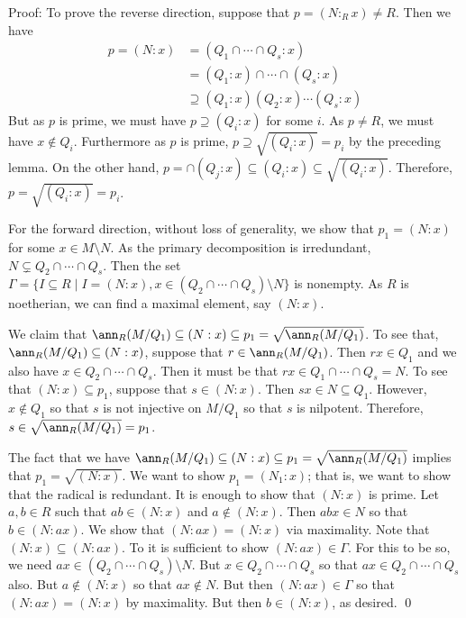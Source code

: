 \noindent Proof: To prove the reverse direction, suppose that $p=(N:_R x) \neq R$. Then we have
\[
\begin{split}
p=(N:x)&= (Q_1 \cap \cdots \cap Q_s: x) \\
&=(Q_1 :x) \cap \cdots \cap (Q_s: x) \\
&\supseteq (Q_1:x)(Q_2:x)\cdots(Q_s:x)
\end{split}
\]
But as $p$ is prime, we must have $p \supseteq (Q_i:x)$ for some $i$. As $p \neq R$, we must have $x \notin Q_i$. Furthermore as $p$ is prime, $p \supseteq \sqrt{(Q_i:x)}=p_i$ by the preceding lemma. On the other hand, $p=\cap (Q_j:x) \subseteq (Q_i:x) \subseteq \sqrt{(Q_i:x)}$. Therefore, $p=\sqrt{(Q_i:x)}=p_i$. 

For the forward direction, without loss of generality, we show that $p_1=(N:x)$ for some $x \in M \setminus N$. As the primary decomposition is irredundant, $N \subsetneq Q_2 \cap \cdots \cap Q_s$. Then the set $\Gamma=\{I \subseteq R \;|\; I=(N:x), x \in (Q_2 \cap \cdots \cap Q_s) \setminus N\}$ is nonempty. As $R$ is noetherian, we can find a maximal element, say $(N:x)$. 

We claim that $\ann_R(M/Q_1) \subseteq (N:x) \subseteq p_1=\sqrt{\ann_R(M/Q_1)}$. To see that, $\ann_R(M/Q_1) \subseteq (N:x)$, suppose that $r \in \ann_R(M/Q_1)$. Then $rx \in Q_1$ and we also have $x \in Q_2 \cap \cdots \cap Q_s$. Then it must be that $rx \in Q_1 \cap \cdots \cap Q_s=N$. To see that $(N:x) \subseteq p_1$, suppose that $s \in (N:x)$. Then $sx \in N \subseteq Q_1$. However, $x \notin Q_1$ so that $s$ is not injective on $M/Q_1$ so that $s$ is nilpotent. Therefore, $s \in \sqrt{\ann_R(M/Q_1)}=p_1$. 

The fact that we have $\ann_R(M/Q_1) \subseteq (N:x) \subseteq p_1=\sqrt{\ann_R(M/Q_1)}$ implies that $p_1=\sqrt{(N:x)}$. We want to show $p_1=(N_1:x)$; that is, we want to show that the radical is redundant. It is enough to show that $(N:x)$ is prime. Let $a,b \in R$ such that $ab \in (N:x)$ and $a \notin (N:x)$. Then $abx \in N$ so that $b \in (N:ax)$. We show that $(N:ax)=(N:x)$ via maximality. Note that $(N:x) \subseteq (N:ax)$. To it is sufficient to show $(N:ax) \in \Gamma$. For this to be so, we need $ax \in (Q_2 \cap \cdots \cap Q_s) \setminus N$. But $x \in Q_2 \cap \cdots \cap Q_s$ so that $ax \in Q_2 \cap \cdots \cap Q_s$ also. But $a \notin (N:x)$ so that $ax \notin N$. But then $(N:ax) \in \Gamma$ so that $(N:ax)=(N:x)$ by maximality. But then $b \in (N:x)$, as desired. \qed \\

